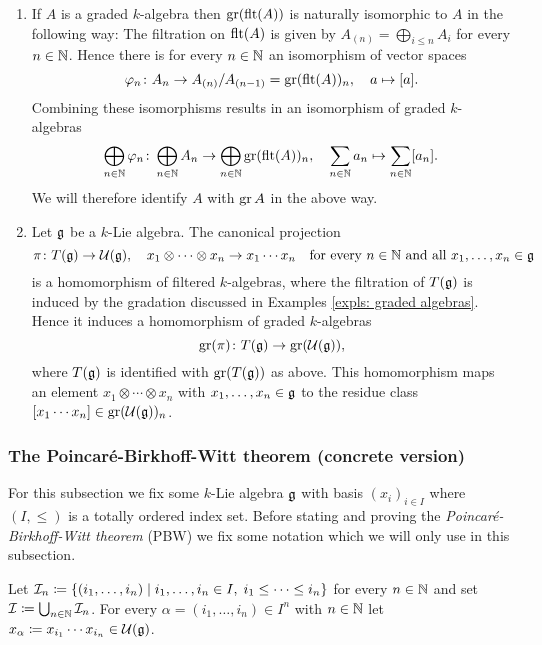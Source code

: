 \begin{expls}
 \begin{enumerate}[leftmargin=*]
  \item
   If $A$ is a graded $k$-algebra then $\operatorname{gr}(\operatorname{flt}(A))$ is naturally isomorphic to $A$ in the following way: The filtration on $\operatorname{flt}(A)$ is given by $A_{(n)} = \bigoplus_{i \leq n} A_i$ for every $n \in \mathbb{N}$. Hence there is for every $n \in \mathbb{N}$ an isomorphism of vector spaces
   \[
    \varphi_n \colon A_n \to A_{(n)}/A_{(n-1)} = \operatorname{gr}(\operatorname{flt}(A))_n, \quad a \mapsto [a].
   \]
   Combining these isomorphisms results in an isomorphism of graded $k$-algebras
   \[
    \bigoplus_{n \in \mathbb{N}} \varphi_n \colon
    \bigoplus_{n \in \mathbb{N}} A_n \to \bigoplus_{n \in \mathbb{N}} \operatorname{gr}(\operatorname{flt}(A))_n, \quad
    \sum_{n \in \mathbb{N}} a_n \mapsto \sum_{n \in \mathbb{N}} [a_n].
   \]
   We will therefore identify $A$ with $\operatorname{gr} A$ in the above way.
  \item
   Let $\mathfrak{g}$ be a $k$-Lie algebra. The canonical projection
   \[
    \pi \colon T(\mathfrak{g}) \to \mathcal{U}(\mathfrak{g}), \quad x_1 \otimes \dotsb \otimes x_n \to x_1 \dotsm x_n
    \quad \text{for every $n \in \mathbb{N}$ and all $x_1, \dotsc, x_n \in \mathfrak{g}$}
   \]
   is a homomorphism of filtered $k$-algebras, where the filtration of $T(\mathfrak{g})$ is induced by the gradation discussed in Examples \ref{expls: graded algebras}. Hence it induces a homomorphism of graded $k$-algebras
   \[
    \operatorname{gr}(\pi) \colon T(\mathfrak{g}) \to \operatorname{gr}(\mathcal{U}(\mathfrak{g})),
   \]
   where $T(\mathfrak{g})$ is identified with $\operatorname{gr}(T(\mathfrak{g}))$ as above. This homomorphism maps an element $x_1 \otimes \dotsb \otimes x_n$ with $x_1, \dots, x_n \in \mathfrak{g}$ to the residue class $[x_1 \dotsm x_n] \in \operatorname{gr}(\mathcal{U}(\mathfrak{g}))_n$.
 \end{enumerate}
\end{expls}



\subsubsection{The Poincar\'{e}-Birkhoff-Witt theorem (concrete version)}
For this subsection we fix some $k$-Lie algebra $\mathfrak{g}$ with basis $(x_i)_{i \in I}$ where $(I, \leq)$ is a totally ordered index set. Before stating and proving the \emph{Poincar\'{e}-Birkhoff-Witt theorem} (PBW) we fix some notation which we will only use in this subsection.


\begin{defi}
 Let $\mathcal{I}_n \coloneqq \{(i_1, \dotsc, i_n) \mid i_1, \dotsc, i_n \in I, \; i_1 \leq \dotsb \leq i_n\}$ for every $n \in \mathbb{N}$ and set $\mathcal{I} \coloneqq \bigcup_{n \in \mathbb{N}} \mathcal{I}_n$. For every $\alpha = (i_1, \dotsc, i_n) \in I^n$ with $n \in \mathbb{N}$ let $x_\alpha \coloneqq x_{i_1} \dotsm x_{i_n} \in \mathcal{U}(\mathfrak{g})$.
\end{defi}


